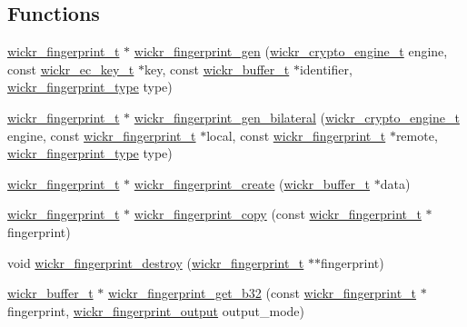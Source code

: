 \subsection*{Functions}
\begin{DoxyCompactItemize}
\item 
\mbox{\hyperlink{structwickr__fingerprint}{wickr\+\_\+fingerprint\+\_\+t}} $\ast$ \mbox{\hyperlink{group__wickr__fingerprint_gac4791ddf5ea675508dd6627ebf33c62e}{wickr\+\_\+fingerprint\+\_\+gen}} (\mbox{\hyperlink{structwickr__crypto__engine}{wickr\+\_\+crypto\+\_\+engine\+\_\+t}} engine, const \mbox{\hyperlink{structwickr__ec__key}{wickr\+\_\+ec\+\_\+key\+\_\+t}} $\ast$key, const \mbox{\hyperlink{structwickr__buffer}{wickr\+\_\+buffer\+\_\+t}} $\ast$identifier, \mbox{\hyperlink{group__wickr__fingerprint_ga09d6f8936a6d1fbacb13c643c2e81810}{wickr\+\_\+fingerprint\+\_\+type}} type)
\item 
\mbox{\hyperlink{structwickr__fingerprint}{wickr\+\_\+fingerprint\+\_\+t}} $\ast$ \mbox{\hyperlink{group__wickr__fingerprint_gae26d5c57687ae01678495b4e3962963d}{wickr\+\_\+fingerprint\+\_\+gen\+\_\+bilateral}} (\mbox{\hyperlink{structwickr__crypto__engine}{wickr\+\_\+crypto\+\_\+engine\+\_\+t}} engine, const \mbox{\hyperlink{structwickr__fingerprint}{wickr\+\_\+fingerprint\+\_\+t}} $\ast$local, const \mbox{\hyperlink{structwickr__fingerprint}{wickr\+\_\+fingerprint\+\_\+t}} $\ast$remote, \mbox{\hyperlink{group__wickr__fingerprint_ga09d6f8936a6d1fbacb13c643c2e81810}{wickr\+\_\+fingerprint\+\_\+type}} type)
\item 
\mbox{\hyperlink{structwickr__fingerprint}{wickr\+\_\+fingerprint\+\_\+t}} $\ast$ \mbox{\hyperlink{group__wickr__fingerprint_ga6041cfce95478334c8e046ad88c3d166}{wickr\+\_\+fingerprint\+\_\+create}} (\mbox{\hyperlink{structwickr__buffer}{wickr\+\_\+buffer\+\_\+t}} $\ast$data)
\item 
\mbox{\hyperlink{structwickr__fingerprint}{wickr\+\_\+fingerprint\+\_\+t}} $\ast$ \mbox{\hyperlink{group__wickr__fingerprint_gac2497b535d0864b0fcc91004a979a313}{wickr\+\_\+fingerprint\+\_\+copy}} (const \mbox{\hyperlink{structwickr__fingerprint}{wickr\+\_\+fingerprint\+\_\+t}} $\ast$fingerprint)
\item 
void \mbox{\hyperlink{group__wickr__fingerprint_ga7d3600525872a1d587b2774db7b8b12a}{wickr\+\_\+fingerprint\+\_\+destroy}} (\mbox{\hyperlink{structwickr__fingerprint}{wickr\+\_\+fingerprint\+\_\+t}} $\ast$$\ast$fingerprint)
\item 
\mbox{\hyperlink{structwickr__buffer}{wickr\+\_\+buffer\+\_\+t}} $\ast$ \mbox{\hyperlink{group__wickr__fingerprint_ga7d50dd168023042163c1952b53af468b}{wickr\+\_\+fingerprint\+\_\+get\+\_\+b32}} (const \mbox{\hyperlink{structwickr__fingerprint}{wickr\+\_\+fingerprint\+\_\+t}} $\ast$fingerprint, \mbox{\hyperlink{group__wickr__fingerprint_gafaac3f13daae0b97e91f3fb744f4c9e2}{wickr\+\_\+fingerprint\+\_\+output}} output\+\_\+mode)
$$
\end{DoxyCompactItemize}
